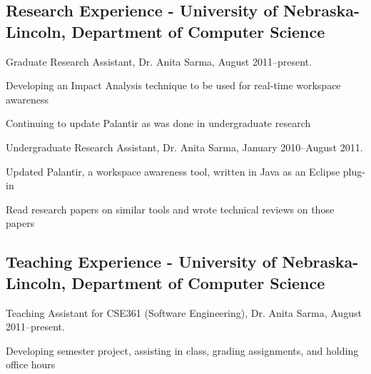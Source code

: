 \documentclass[10pt,letterpaper]{article}
\renewenvironment{itemize}{
  \begin{list}{}{
    \setlength{\leftmargin}{1.5em}
    \setlength{\itemsep}{0.25em}
    \setlength{\parskip}{0pt}
    \setlength{\parsep}{0.25em}
  }
}{
  \end{list}
}
\begin{document}
\subsection*{Research Experience - University of Nebraska-Lincoln, Department of Computer Science}

\begin{itemize}
\item Graduate Research Assistant, Dr. Anita Sarma, August 2011--present.
	\begin{itemize}
	\item Developing an Impact Analysis technique to be used for real-time workspace awareness
	\item Continuing to update Palantir as was done in undergraduate research
	\end{itemize}
\end{itemize}

\begin{itemize}
\item Undergraduate Research Assistant, Dr. Anita Sarma, January 2010--August 2011.
	\begin{itemize}
	\item Updated Palantir, a workspace awareness tool, written in Java as an Eclipse plug-in
	\item Read research papers on similar tools and wrote technical reviews on those papers
	\end{itemize}
\end{itemize}

\subsection*{Teaching Experience - University of Nebraska-Lincoln, Department of Computer Science}

\begin{itemize}
\item Teaching Assistant for CSE361 (Software Engineering), Dr. Anita Sarma, August 2011--present.
	\begin{itemize}
	\item Developing semester project, assisting in class, grading assignments, and holding office hours
	\end{itemize}
\end{itemize}
\end{document}
